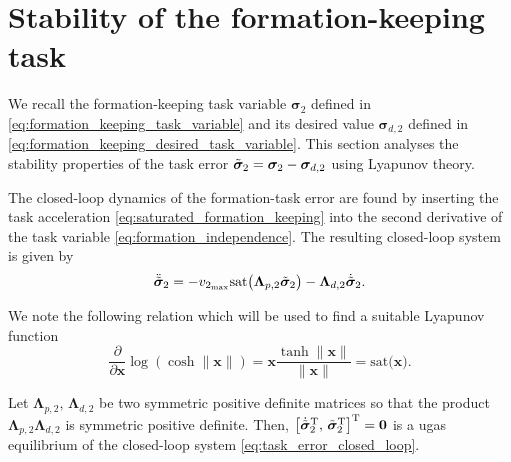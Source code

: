 \section{Stability of the formation-keeping task}\label{sec:closed_loop_formation_keeping}
We recall the formation-keeping task variable $\bm{\sigma}_2$ defined in \eqref{eq:formation_keeping_task_variable} and its desired value $\bm{\sigma}_{d,2}$ defined in \eqref{eq:formation_keeping_desired_task_variable}. This section analyses the stability properties of the task error $\Tilde{\bm{\sigma}}_2 = \bm{\sigma}_2 - \bm{\sigma}_{d,2}$ using Lyapunov theory. 

The closed-loop dynamics of the formation-task error are found by inserting the task acceleration \eqref{eq:saturated_formation_keeping} into the second derivative of the task variable \eqref{eq:formation_independence}. The resulting closed-loop system is given by
\begin{equation}
    \label{eq:task_error_closed_loop}
    \ddot{\Tilde{\bm{\sigma}}}_2 = - v_{2_{\max}}\mathrm{sat}\bigl(\mathbf{\Lambda}_{p,2}\Tilde{\bm{\sigma}}_2\bigr) - \mathbf{\Lambda}_{d,2} \dot{\Tilde{\bm{\sigma}}}_2.
\end{equation}

We note the following relation which will be used to find a suitable Lyapunov function
\begin{equation}
    \frac{\partial}{\partial \mathbf{x}} \log \left(\cosh{\|\mathbf{x}\|}\right) = \mathbf{x}\frac{\tanh{\|\mathbf{x}\|}}{\|\mathbf{x}\|} = \mathrm{sat}\bigl(\mathbf{x}\bigr).
\end{equation}

\begin{theorem}\label{theorem:formation_keeping}
    Let $\mathbf{\Lambda}_{p,2}, \, \mathbf{\Lambda}_{d,2}$ be two symmetric positive definite matrices so that the product $\mathbf{\Lambda}_{p,2} \mathbf{\Lambda}_{d,2}$ is symmetric positive definite. Then, $\bigl[\dot{\Tilde{\bm{\sigma}}}_2^{\rm T},\, \Tilde{\bm{\sigma}}_2^{\rm T}\bigr]^{\rm T} = \mathbf{0}$ is a \gls{ugas} equilibrium of the closed-loop system \eqref{eq:task_error_closed_loop}.
\end{theorem}

